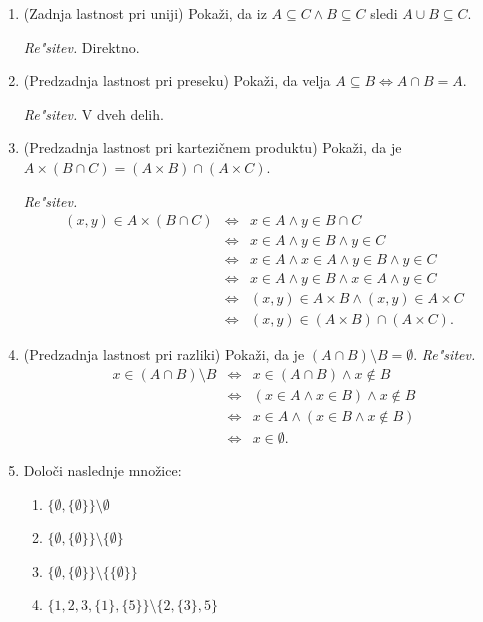 \documentclass[11pt,paper=b5,DIV=13,headinclude,footinclude]{scrbook}
\begin{document}
\begin{enumerate}
\item {\color{blue}(Zadnja lastnost pri uniji) Pokaži, da iz
$A\subseteq C \land B\subseteq C$ sledi $A\cup B\subseteq C$.}

\emph{ Re"sitev.} Direktno.

\item {\color{blue}(Predzadnja lastnost pri preseku) Pokaži, da velja
$A\subseteq B \Leftrightarrow A\cap B = A$.}

\emph{ Re"sitev.} V dveh delih.

\item {\color{blue}(Predzadnja lastnost pri kartezičnem produktu) Pokaži, da
je $A\times (B\cap C) = (A\times B)\cap (A\times C)$.}

\emph{ Re"sitev.} 
\begin{eqnarray*}
(x,y)\in A\times (B\cap C) &\Leftrightarrow & x \in A \wedge y\in B\cap C\\
&\Leftrightarrow & x \in A \wedge y\in B  \wedge y\in C\\
&\Leftrightarrow & x \in A \wedge x \in A\wedge y\in B  \wedge y\in C\\
&\Leftrightarrow & x \in A \wedge  y\in B  \wedge x \in A\wedge y\in C\\
&\Leftrightarrow & (x,y) \in A\times B \wedge  (x,y) \in A\times C\\
&\Leftrightarrow & (x,y) \in (A\times B)\cap   (A\times C).
\end{eqnarray*}

\item {\color{blue}(Predzadnja lastnost pri razliki) Pokaži, da je
$(A\cap B)\setminus B = \emptyset$.}
\emph{ Re"sitev.} 
\begin{eqnarray*}
x\in (A\cap B )\setminus B  &\Leftrightarrow & x \in (A\cap B)  \wedge x\notin B\\
&\Leftrightarrow & (x\in A\wedge x\in  B ) \wedge x\notin B\\
&\Leftrightarrow & x\in A\wedge (x\in  B  \wedge x\notin B)\\
&\Leftrightarrow & x\in \emptyset.
\end{eqnarray*}

\item {\color{blue}Določi naslednje množice:}
\begin{enumerate}
\item[(i)] $\{\emptyset, \{\emptyset\}\}\setminus \emptyset$ \quad [$\{\emptyset, \{\emptyset\}\}$]
\item[(ii)] $\{\emptyset, \{\emptyset\}\}\setminus \{\emptyset\}$
\item[(iii)] $\{\emptyset, \{\emptyset\}\}\setminus \{\{\emptyset\}\}$
\item[(iv)] $\{1,2,3,\{1\}, \{5\}  \}\setminus \{2,\{3\},5\}$
\end{enumerate}


\end{enumerate}
\end{document}
